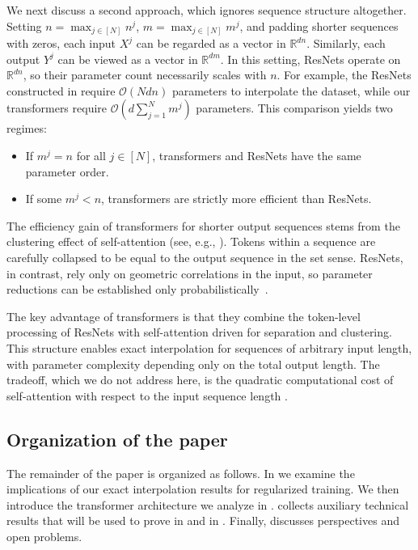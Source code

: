 \documentclass[pdflatex,sn-mathphys-num]{sn-jnl}%
\theoremstyle{thmstyleone}%
\theoremstyle{thmstyletwo}%
\theoremstyle{thmstylethree}%
\numberwithin{equation}{section}
\newcommand{\R}{\mathbb{R}}
\begin{document}
We next discuss a second approach, which ignores sequence structure altogether. Setting $n = \max_{j\in[N]} n^j$, $m = \max_{j\in[N]} m^j$, and padding shorter sequences with zeros, each input $X^j$ can be regarded as a vector in $\R^{dn}$. Similarly, each output $Y^j$ can be viewed as a vector in $\R^{dm}$. 
In this setting, ResNets operate on $\R^{dn}$, so their parameter count necessarily scales with $n$. For example, the ResNets constructed in \cite{domenec2023NODES} require $\mathcal{O}(Nd n)$ parameters to interpolate the dataset, while our transformers require $\mathcal{O}(d\sum_{j = 1}^N m^j)$ parameters. This comparison yields two regimes:
\begin{itemize}
    \item If $m^j=n$ for all $j\in[N]$, transformers and ResNets have the same parameter order.
    \item If some $m^j<n$, transformers are strictly more efficient than ResNets.
\end{itemize}
%
The efficiency gain of transformers for shorter output sequences stems from the clustering effect of self-attention (see, e.g., \cite{geshkovski2023emergence, geshkovski2025mathematical, alcalde2025clustering, karagodin2024clustering, burger2025analysis}). Tokens within a sequence are carefully collapsed to be equal to the output sequence in the set sense. ResNets, in contrast, rely only on geometric correlations in the input, so parameter reductions can be established only probabilistically~\cite{alvarez2025clusterClassification}.

The key advantage of transformers is that they combine the token-level processing of ResNets with self-attention driven for separation and clustering. This structure enables exact interpolation for sequences of arbitrary input length, with parameter complexity depending only on the total output length. The tradeoff, which we do not address here, is the quadratic computational cost of self-attention with respect to the input sequence length \cite{vaswaniAttentionAllYou2017}.

\subsection{Organization of the paper}
The remainder of the paper is organized as follows. In  we examine the implications of our exact interpolation results for regularized training. We then introduce the transformer architecture we analyze in .  collects auxiliary technical results that will be used to prove  in  and  in . Finally,  discusses perspectives and open problems.
\end{document}
